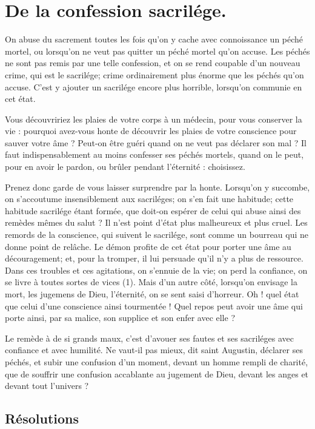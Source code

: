 \documentclass[instructions.tex]{subfiles}
\begin{document}
 
\chapter{De la confession sacrilége.}
 
\primo On abuse du sacrement toutes les fois qu’on y cache avec connoissance un péché mortel, ou lorsqu’on ne veut pas quitter un péché mortel qu’on accuse. Les péchés ne sont pas remis par une telle confession, et on se rend coupable d’un nouveau crime, qui est le sacrilége; crime ordinairement plus énorme que les péchés qu’on accuse. C’est y ajouter un sacrilége encore plus horrible, lorsqu’on communie en cet état.
 
Vous découvririez les plaies de votre corps à un médecin, pour vous conserver la vie : pourquoi avez-vous honte de découvrir les plaies de votre conscience pour sauver votre âme ? Peut-on être guéri quand on ne veut pas déclarer son mal ? Il faut indispensablement au moins confesser ses péchés mortels, quand on le peut, pour en avoir le pardon, ou brûler pendant l’éternité : choisissez.
 
\secundo Prenez donc garde de vous laisser surprendre par la honte. Lorsqu’on y succombe, on s’accoutume insensiblement aux sacriléges; on s’en fait une habitude; cette habitude sacrilége étant formée, que doit-on espérer de celui qui abuse ainsi des remèdes mêmes du salut ? Il n’est point d’état plus malheureux et plus cruel. Les remords de la conscience, qui suivent le sacrilége, sont comme un bourreau qui ne donne point de relâche. Le démon profite de cet état pour porter une âme au découragement; et, pour la tromper, il lui persuade qu’il n’y a plus de ressource. Dans ces troubles et ces agitations, on s’ennuie de la vie; on perd la confiance, on se livre à toutes sortes de vices (1). Mais d’un autre côté, lorsqu’on envisage la mort, les jugemens de Dieu, l’éternité, on se sent saisi d’horreur. Oh ! quel état que celui d’une conscience ainsi tourmentée ! Quel repos peut avoir une âme qui porte ainsi, par sa malice, son supplice et son enfer avec elle ?
 
Le remède à de si grands maux, c’est d’avouer ses fautes et ses sacriléges avec confiance et avec humilité. Ne vaut-il pas mieux, dit saint Augustin, déclarer ses péchés, et subir une confusion d’un moment, devant un homme rempli de charité, que de souffrir une confusion accablante au jugement de Dieu, devant les anges et devant tout l’univers ?
 
\section{Résolutions}
 
\end{document}
